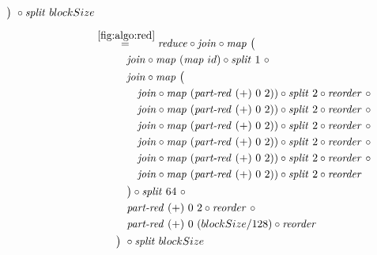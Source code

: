 \begin{align*}
\begin{aligned}
    &\qquad\big)\ \circ \splitN\ blockSize
  \end{aligned}\\[.5em]
%
  &\hspace{-2em}\quad\begin{aligned}
    &\overset{\ref{fig:algo:red}}{=\hspace{.2em}}
      \reduce \circ \join \circ \map\ \big(\\
    &\qquad\quad\join \circ \map\ (\map\ id) \circ \splitN\ 1\ \circ\\
    &\qquad\quad\join \circ \map\ \big(\\
    &\qquad\qquad \join \circ \map\ (\partRed\ (+)\ 0\ 2))\circ \splitN\ 2 \circ \reorder\ \circ\\
    &\qquad\qquad \join \circ \map\ (\partRed\ (+)\ 0\ 2))\circ \splitN\ 2 \circ \reorder\ \circ\\
    &\qquad\qquad \join \circ \map\ (\partRed\ (+)\ 0\ 2))\circ \splitN\ 2 \circ \reorder\ \circ\\
    &\qquad\qquad \join \circ \map\ (\partRed\ (+)\ 0\ 2))\circ \splitN\ 2 \circ \reorder\ \circ\\
    &\qquad\qquad \join \circ \map\ (\partRed\ (+)\ 0\ 2))\circ \splitN\ 2 \circ \reorder\ \circ\\
    &\qquad\qquad \join \circ \map\ (\partRed\ (+)\ 0\ 2))\circ \splitN\ 2 \circ \reorder\\
    &\qquad\quad\big)\circ \splitN\ 64\ \circ\\
    &\qquad\quad\partRed\ (+)\ 0\ 2\circ \reorder\ \circ \\
    &\qquad\quad\partRed\ (+)\ 0\ (blockSize/128)\circ \reorder \\
    &\qquad\big)\ \circ \splitN\ blockSize
  \end{aligned}\\[.5em]
%
\end{align*}

